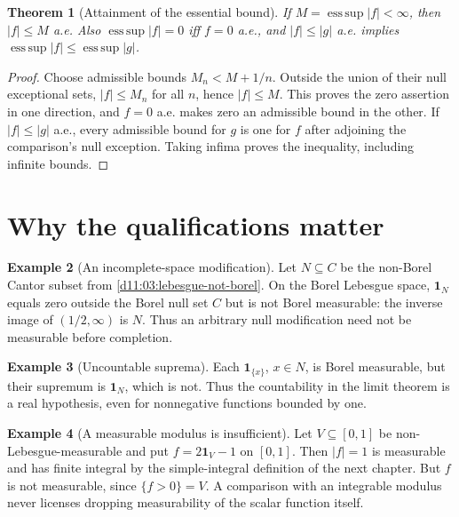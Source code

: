 \documentclass[11pt,oneside,openany]{book}
\newtheorem{theorem}{Theorem}[chapter]
\theoremstyle{definition}
\newtheorem{example}[theorem]{Example}
\theoremstyle{remark}
\newcommand{\one}{\mathbf1}\newcommand{\ind}[1]{\mathbf1_{#1}}
\DeclareMathOperator{\esssup}{ess\,sup}\DeclareMathOperator{\Var}{Var}
\newcommand{\family}[1]{}
\begin{document}
\begin{theorem}[Attainment of the essential bound]
\family{D11.04.essential_bound_attained}\label{d11:04:essential-bound-attained}
If $M=\esssup|f|<\infty$, then $|f|\leq M$ a.e.
Also $\esssup|f|=0$ iff $f=0$ a.e., and $|f|\leq|g|$ a.e. implies
$\esssup|f|\leq\esssup|g|$.
\end{theorem}
\begin{proof}
Choose admissible bounds $M_n<M+1/n$. Outside the union of their null
exceptional sets, $|f|\leq M_n$ for all $n$, hence $|f|\leq M$.
This proves the zero assertion in one direction, and $f=0$ a.e. makes zero
an admissible bound in the other. If $|f|\leq|g|$ a.e., every admissible
bound for $g$ is one for $f$ after adjoining the comparison's null exception.
Taking infima proves the inequality, including infinite bounds.
\end{proof}

\section{Why the qualifications matter}

\begin{example}[An incomplete-space modification]
\family{D11.04.incomplete_modification_failure}\label{d11:04:incomplete-modification-failure}
Let $N\subseteq C$ be the non-Borel Cantor subset from
\cref{d11:03:lebesgue-not-borel}. On the Borel Lebesgue space, $\one_N$
equals zero outside the Borel null set $C$ but is not Borel measurable:
the inverse image of $(1/2,\infty)$ is $N$. Thus an arbitrary null modification
need not be measurable before completion.
\end{example}

\begin{example}[Uncountable suprema]
\family{D11.04.uncountable_sup_failure}\label{d11:04:uncountable-sup-failure}
Each $\one_{\{x\}}$, $x\in N$, is Borel measurable, but their supremum
is $\one_N$, which is not. Thus the countability in the limit theorem is
a real hypothesis, even for nonnegative functions bounded by one.
\end{example}

\begin{example}[A measurable modulus is insufficient]
\family{D11.04.measurable_modulus_insufficient}\label{d11:04:measurable-modulus-insufficient}
Let $V\subseteq[0,1]$ be non-Lebesgue-measurable and put
$f=2\one_V-1$ on $[0,1]$. Then $|f|=1$ is measurable and has finite
integral by the simple-integral definition of the next chapter. But $f$
is not measurable, since $\{f>0\}=V$. A comparison with an integrable
modulus never licenses dropping measurability of the scalar function itself.
\end{example}
\end{document}
